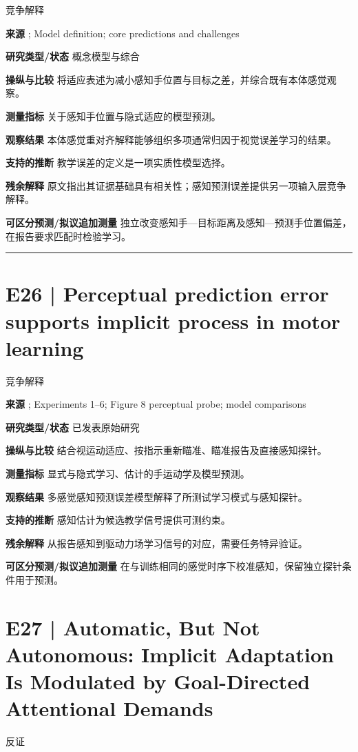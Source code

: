 \documentclass[11pt,a4paper]{article}
\begin{document}
{\small\sffamily\color{navy} 竞争解释}\par
\textbf{来源} \cite{premo2022}; Model definition; core predictions and challenges\par
\textbf{研究类型/状态} 概念模型与综合\par
\textbf{操纵与比较} 将适应表述为减小感知手位置与目标之差，并综合既有本体感觉观察。\par
\textbf{测量指标} 关于感知手位置与隐式适应的模型预测。\par
\textbf{观察结果} 本体感觉重对齐解释能够组织多项通常归因于视觉误差学习的结果。\par
\textbf{支持的推断} 教学误差的定义是一项实质性模型选择。\par
\textbf{残余解释} 原文指出其证据基础具有相关性；感知预测误差提供另一项输入层竞争解释。\par
\textbf{可区分预测/拟议追加测量} 独立改变感知手---目标距离及感知---预测手位置偏差，在报告要求匹配时检验学习。\par
\bigskip\hrule\medskip\section{E26 | Perceptual prediction error supports implicit process in motor learning}
{\small\sffamily\color{navy} 竞争解释}\par
\textbf{来源} \cite{percept2026}; Experiments 1--6; Figure 8 perceptual probe; model comparisons\par
\textbf{研究类型/状态} 已发表原始研究\par
\textbf{操纵与比较} 结合视运动适应、按指示重新瞄准、瞄准报告及直接感知探针。\par
\textbf{测量指标} 显式与隐式学习、估计的手运动学及模型预测。\par
\textbf{观察结果} 多感觉感知预测误差模型解释了所测试学习模式与感知探针。\par
\textbf{支持的推断} 感知估计为候选教学信号提供可测约束。\par
\textbf{残余解释} 从报告感知到驱动力场学习信号的对应，需要任务特异验证。\par
\textbf{可区分预测/拟议追加测量} 在与训练相同的感觉时序下校准感知，保留独立探针条件用于预测。\par
\clearpage\section{E27 | Automatic, But Not Autonomous: Implicit Adaptation Is Modulated by Goal-Directed Attentional Demands}
{\small\sffamily\color{navy} 反证}\par
\end{document}
